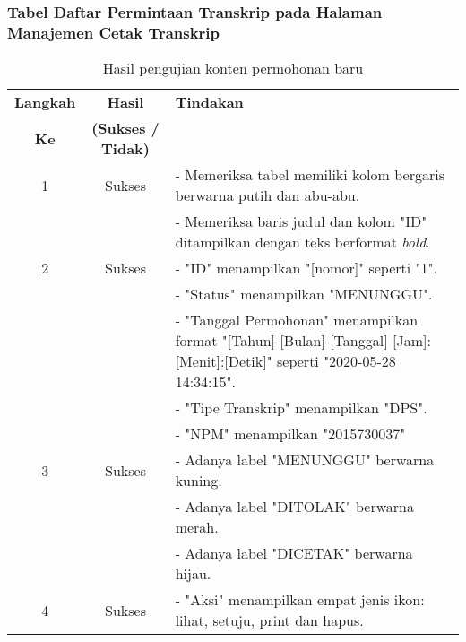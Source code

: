 \subsubsection{Tabel Daftar Permintaan Transkrip pada Halaman Manajemen Cetak Transkrip}
\begin{table}[H]
	\centering 
	\caption{Hasil pengujian konten permohonan baru}
	\label{hasil:DaftarPermintaanTranskrip}
	\begin{tabular}{|c| c| p{}|}
		\toprule
		\textbf{Langkah} & \textbf{Hasil} & \textbf{Tindakan}\\
		\textbf{Ke} & \textbf{(Sukses / Tidak)} &\\
		\midrule
		1&Sukses&- Memeriksa tabel memiliki kolom bergaris berwarna putih dan abu-abu.\\
		&& - Memeriksa baris judul dan kolom "ID" ditampilkan dengan teks berformat \textit{bold}.	\\	
		\hline
		2&Sukses&- "ID" menampilkan "[nomor]" seperti "1".\\
		&&- "Status" menampilkan "MENUNGGU".\\
		&&- "Tanggal Permohonan" menampilkan format "[Tahun]-[Bulan]-[Tanggal] [Jam]:[Menit]:[Detik]" seperti "2020-05-28 14:34:15".\\
		&&- "Tipe Transkrip" menampilkan "DPS".\\
		&&- "NPM" menampilkan "2015730037"\\
		\hline
		3&Sukses& - Adanya label "MENUNGGU" berwarna kuning.\\
		&& - Adanya label "DITOLAK" berwarna merah.\\
		&& - Adanya label "DICETAK" berwarna hijau.\\
		\hline
		4&Sukses&- "Aksi" menampilkan empat jenis ikon: lihat, setuju, print dan hapus.\\
		
		\bottomrule		
	\end{tabular} 
\end{table}

